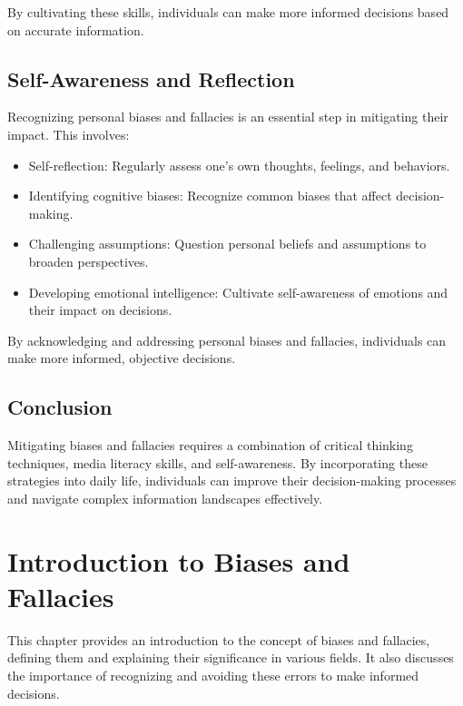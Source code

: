 \documentclass{report}%
\begin{document}
{{{{{{{{{{{By cultivating these skills, individuals can make more informed decisions based on accurate information.

\section{Self-Awareness and Reflection}

Recognizing personal biases and fallacies is an essential step in mitigating their impact. This involves:

\begin{itemize}
    \item Self-reflection: Regularly assess one's own thoughts, feelings, and behaviors.
    \item Identifying cognitive biases: Recognize common biases that affect decision-making.
    \item Challenging assumptions: Question personal beliefs and assumptions to broaden perspectives.
    \item Developing emotional intelligence: Cultivate self-awareness of emotions and their impact on decisions.
\end{itemize}

By acknowledging and addressing personal biases and fallacies, individuals can make more informed, objective decisions.

\section{Conclusion}

Mitigating biases and fallacies requires a combination of critical thinking techniques, media literacy skills, and self-awareness. By incorporating these strategies into daily life, individuals can improve their decision-making processes and navigate complex information landscapes effectively.%
\maketitle%
\tableofcontents%
%
\chapter{Introduction to Biases and Fallacies}%
This chapter provides an introduction to the concept of biases and fallacies, defining them and explaining their significance in various fields. It also discusses the importance of recognizing and avoiding these errors to make informed decisions.

}}}}}}}}}}}
\end{document}
